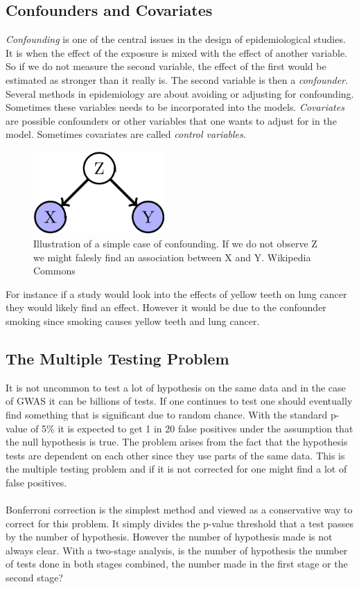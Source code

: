 \documentclass[10pt,a4paper]{report}
\begin{document}
\subsection{Confounders and Covariates}
\emph{Confounding} is one of the central issues in the design of epidemiological studies. It is when the effect of the exposure is mixed with the effect of another variable. So if we do not measure the second variable, the effect of the first would be estimated as stronger than it really is. The second variable is then a \emph{confounder}. Several methods in epidemiology are about avoiding or adjusting for confounding. Sometimes these variables needs to be incorporated into the models. \emph{Covariates} are possible confounders or other variables that one wants to adjust for in the model. Sometimes covariates are called \emph{control variables}.\cite{rothman2002intro_epidemiology,rothman1998modern}

\begin{figure}[h]
    \centering
    \includegraphics[width=5cm]{Simple_Confounding_Case.png}
    \caption{Illustration of a simple case of confounding. If we do not observe Z we might falesly find an association between X and Y. Wikipedia Commons}
    \label{fig:confunding}
\end{figure}

For instance if a study would look into the effects of yellow teeth on lung cancer they would likely find an effect. However it would be due to the confounder smoking since smoking causes yellow teeth and lung cancer.

\subsection{The Multiple Testing Problem}
It is not uncommon to test a lot of hypothesis on the same data and in the case of GWAS it can be billions of tests. If one continues to test one should eventually find something that is significant due to random chance. With the standard p-value of 5\% it is expected to get 1 in 20 false positives under the assumption that the null hypothesis is true. The problem arises from the fact that the hypothesis tests are dependent on each other since they use parts of the same data. This is the multiple testing problem and if it is not corrected for one might find a lot of false positives.\cite{bonferroni_multiple}\\
\\
Bonferroni correction is the simplest method and viewed as a conservative way to correct for this problem. It simply divides the p-value threshold that a test passes by the number of hypothesis. However the number of hypothesis made is not always clear. With a two-stage analysis, is the number of hypothesis the number of tests done in both stages combined, the number made in the first stage or the second stage?\cite{bonferroni_multiple}
\end{document}
